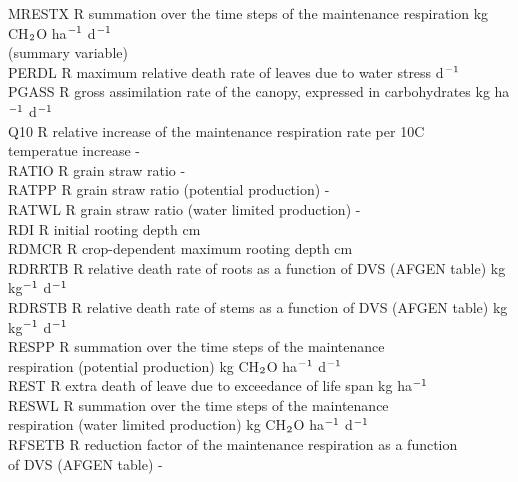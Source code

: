 \documentclass[11pt]{article}
\begin{document}
\begin{tabbing}
MRESTX\> \> R\> summation over the time steps of the maintenance respiration\> \> \> \> \> \> \> kg CH$_{{\rm 2}}$O ha$^{{\rm -1}}$ d$^{{\rm -1}}$\\
\>\> \> (summary variable)\\
PERDL\> \> R\> maximum relative death rate of leaves due to water stress\> \> \> \> \> \> \> d$^{{\rm -1}}$\\
PGASS   \> \> R   \> gross assimilation rate of the canopy, expressed in carbohydrates   \> \> \> \> \> \> \> kg ha$^{{\rm -1}}$ d$^{{\rm -1}}$\\
Q10\> \> R\> relative increase of the maintenance respiration rate per 10\degrees C\\
\>\> \> temperatue increase \> \> \> \> \> \> \> -\\
RATIO\> \> R\> grain straw ratio\> \> \> \> \> \> \> -\\
RATPP\> \> R\> grain straw ratio (potential production)\> \> \> \> \> \> \> -\\
RATWL\> \> R\> grain straw ratio (water limited production)\> \> \> \> \> \> \> -\\
RDI\> \> R\> initial rooting depth\> \> \> \> \> \> \> cm\\
RDMCR\> \> R\> crop-dependent maximum rooting depth\> \> \> \> \> \> \> cm\\
RDRRTB\> \> R\> relative death rate of roots as a function of DVS (AFGEN table)\> \> \> \> \> \> \> kg kg$^{{\rm -1}}$ d$^{{\rm -1}}$\\
RDRSTB\> \> R\> relative death rate of stems as a function of DVS (AFGEN table)\> \> \> \> \> \> \> kg kg$^{{\rm -1}}$ d$^{{\rm -1}}$\\
RESPP\> \> R\> summation over the time steps of the maintenance \\
\>\> \> respiration (potential production)\> \> \> \> \> \> \> kg CH$_{{\rm 2}}$O ha$^{{\rm -1}}$ d$^{{\rm -1}}$\\
REST\> \> R\> extra death of leave due to exceedance of life span\> \> \> \> \> \> \> kg ha$^{{\rm -1}}$\\
RESWL\> \> R\> summation over the time steps of the maintenance \\
\>\> \> respiration (water limited production)\> \> \> \> \> \> \> kg CH$_{{\rm 2}}$O ha$^{{\rm -1}}$ d$^{{\rm -1}}$\\
RFSETB\> \> R\> reduction factor of the maintenance respiration as a function \\
\>\> \> of DVS (AFGEN table)\> \> \> \> \> \> \> -\\

\end{tabbing}
\end{document}

